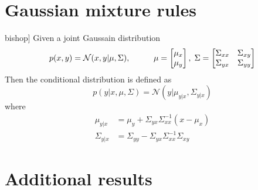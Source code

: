 \chapter{Gaussian mixture rules}
\begin{testexample2}[Conditional of multivariate Gaussian \cite[90]{bishop}]
  Given a joint Gaussain distribution 
  $$p(x,y)= \mathcal{N}(x,y|\mu,\Sigma), 
\hspace{1cm} \mu=\begin{bmatrix}
    \mu_x \\ \mu_y
\end{bmatrix},\hspace{0.1cm} \Sigma = \begin{bmatrix}
    \Sigma_{xx} & \Sigma_{xy}\\ \Sigma_{yx}& \Sigma_{yy}
\end{bmatrix}$$
  Then the conditional distribution is defined as
  \begin{equation}\label{GaussianConditional}
    p(y|x,\mu, \Sigma) = \mathcal{N}(y|\mu_{y|x},\Sigma_{y|x} )
  \end{equation}
  where 
  \begin{align*}
      \mu_{y|x} &= \mu_y+\Sigma_{yx}\Sigma_{xx}^{-1}(x-\mu_x)\\
      \Sigma_{y|x} &= \Sigma_{yy}-\Sigma_{yx}\Sigma_{xx}^{-1}\Sigma_{xy} 
  \end{align*}
\end{testexample2}


\chapter{Additional results}

